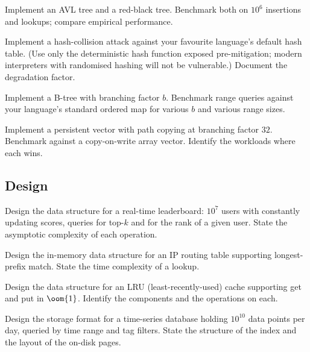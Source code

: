 \begin{exercise}
Implement an AVL tree and a red-black tree. Benchmark both on $10^6$ insertions and lookups; compare empirical performance.
\end{exercise}

\begin{exercise}
Implement a hash-collision attack against your favourite language's default hash table. (Use only the deterministic hash function exposed pre-mitigation; modern interpreters with randomised hashing will not be vulnerable.) Document the degradation factor.
\end{exercise}

\begin{exercise}
Implement a B-tree with branching factor $b$. Benchmark range queries against your language's standard ordered map for various $b$ and various range sizes.
\end{exercise}

\begin{exercise}
Implement a persistent vector with path copying at branching factor $32$. Benchmark against a copy-on-write array vector. Identify the workloads where each wins.
\end{exercise}

\subsection*{Design}

\begin{exercise}
Design the data structure for a real-time leaderboard: $10^7$ users with constantly updating scores, queries for top-$k$ and for the rank of a given user. State the asymptotic complexity of each operation.
\end{exercise}

\begin{exercise}
Design the in-memory data structure for an IP routing table supporting longest-prefix match. State the time complexity of a lookup.
\end{exercise}

\begin{exercise}
Design the data structure for an LRU (least-recently-used) cache supporting get and put in $\oom{1}$. Identify the components and the operations on each.
\end{exercise}

\begin{exercise}
Design the storage format for a time-series database holding $10^{10}$ data points per day, queried by time range and tag filters. State the structure of the index and the layout of the on-disk pages.
\end{exercise}

